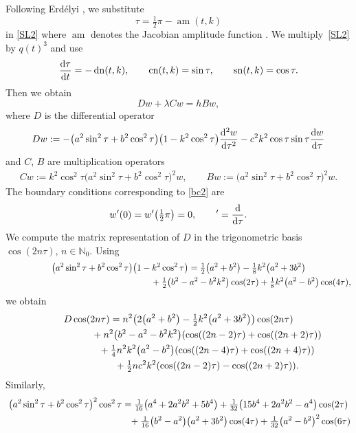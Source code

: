 \documentclass[pdftex]{sigma}
\newcommand{\N}{\mathbb{N}}
\DeclareMathOperator{\sn}{sn}
\DeclareMathOperator{\cn}{cn}
\DeclareMathOperator{\dn}{dn}
\DeclareMathOperator{\am}{am}
\numberwithin{equation}{section}
\begin{document}
Following Erd\'elyi \cite[formula~(4), p.~56]{EMO3}, we substitute
\[ \tau=\tfrac12\pi-\am(t,k) \]
in \eqref{SL2} where $\am$ denotes the Jacobian amplitude function \cite[Section~22.16\,(i)]{dlmf}.
We multiply~\eqref{SL2} by $q(t)^3$ and use
\[ \frac{{\rm d}\tau}{{\rm d}t}=-\dn(t,k),\qquad \cn(t,k)=\sin \tau, \qquad\sn(t,k)=\cos\tau.\]
Then we obtain
\begin{equation}\label{ode7}
D w +\lambda C w= h B w,
\end{equation}
where $D$ is the differential operator
\begin{equation*}%
 Dw:=-\bigl(a^2\sin^2\tau+b^2\cos^2\tau\bigr)\bigl(1-k^2\cos^2\tau\bigr) \frac{{\rm d}^2w}{{\rm d}\tau^2}-c^2k^2\cos\tau\sin\tau \frac{{\rm d}w}{{\rm d}\tau}
\end{equation*}
and $C$, $B$ are multiplication operators
\begin{gather*}
 Cw := k^2\cos^2\tau \bigl(a^2\sin^2\tau+b^2\cos^2\tau\bigr)^2 w,\qquad
 Bw := \bigl(a^2\sin^2\tau+b^2\cos^2\tau\bigr)^2 w.
 \end{gather*}
The boundary conditions corresponding to \eqref{bc2} are
\begin{equation*}%
 w'(0)=w'\bigl(\tfrac12\pi\bigr)=0,\qquad '=\frac{{\rm d}}{{\rm d}\tau} .
\end{equation*}
We compute the matrix representation of $D$ in the trigonometric basis $\cos(2n\tau)$, $n\in\N_0$.
Using
\begin{gather*}
\bigl(a^2\sin^2\tau+b^2\cos^2\tau\bigr)\bigl(1-k^2\cos^2\tau\bigr) =
\tfrac12\bigl(a^2+b^2\bigr)-\tfrac18k^2\bigl(a^2+3b^2\bigr) \\ \hphantom{\bigl(a^2\sin^2\tau+b^2\cos^2\tau\bigr)\bigl(1-k^2\cos^2\tau\bigr) =}{}\!
+\tfrac12\bigl(b^2-a^2-b^2k^2\bigr)\cos(2\tau)+\tfrac18k^2\bigl(a^2-b^2\bigr)\cos(4\tau),
\end{gather*}
we obtain
\begin{gather}
 D\cos(2n\tau)= n^2\bigl(2\bigl(a^2+b^2\bigr)-\tfrac12k^2\bigl(a^2+3b^2\bigr)\bigr)\cos(2n\tau) \nonumber\\ \hphantom{D\cos(2n\tau)=}{}
 +n^2\bigl(b^2-a^2-b^2k^2\bigr)(\cos((2n-2)\tau)+\cos((2n+2)\tau))\nonumber\\ \hphantom{D\cos(2n\tau)=}{}
 + \tfrac14n^2k^2\bigl(a^2-b^2\bigr)(\cos((2n-4)\tau)+\cos((2n+4)\tau))\nonumber \\ \hphantom{D\cos(2n\tau)=}{}
 +\tfrac12 nc^2k^2(\cos((2n-2)\tau)-\cos((2n+2)\tau)).\label{matrixD}
\end{gather}
Similarly,
\begin{gather*}
\bigl(a^2\sin^2\tau+b^2\cos^2\tau\bigr)^2\cos^2\tau =\tfrac1{16}\bigl(a^4+2a^2b^2+5b^4\bigr)+\tfrac1{32}\bigl(15b^4+2a^2b^2-a^4\bigr)\cos(2\tau)
\\ \hphantom{\bigl(a^2\sin^2\tau+b^2\cos^2\tau\bigr)^2\cos^2\tau =}{}
+\tfrac1{16}\bigl(b^2-a^2\bigr)\bigl(a^2+3b^2\bigr)\cos(4\tau) +\tfrac1{32}\bigl(a^2-b^2\bigr)^2\cos(6\tau)
\end{gather*}
\end{document}
